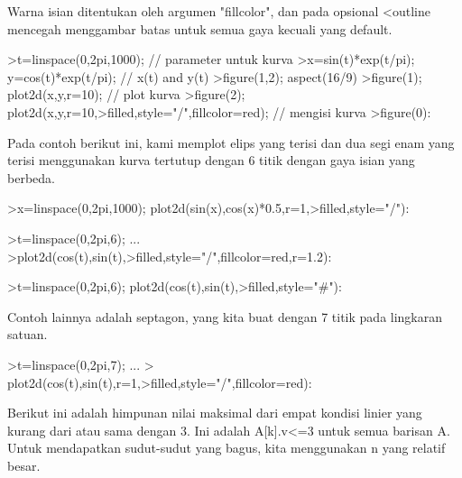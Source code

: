 \documentclass[12pt,arial,letterpaper]{book}
\begin{document}
\begin{eulernootebook}
\begin{eulercomment}
\begin{eulercomment}
\begin{eulernootebook}
\begin{eulercomment}
\begin{eulercomment}
\begin{eulercomment}
\begin{eulercomment}
\begin{eulercomment}
\begin{eulercomment}
\begin{eulercomment}
\begin{eulernotebook}
\begin{eulercomment}
\begin{eulercomment}
\begin{eulercomment}
\begin{eulercomment}
\begin{eulercomment}
Warna isian ditentukan oleh argumen "fillcolor", dan pada opsional
\textless{}outline mencegah menggambar batas untuk semua gaya kecuali yang
default.
\end{eulercomment}
\begin{eulerprompt}
>t=linspace(0,2pi,1000); // parameter untuk kurva
>x=sin(t)*exp(t/pi); y=cos(t)*exp(t/pi); // x(t) and y(t)
>figure(1,2); aspect(16/9)
>figure(1); plot2d(x,y,r=10); // plot kurva
>figure(2); plot2d(x,y,r=10,>filled,style="/",fillcolor=red); // mengisi kurva
>figure(0):
\end{eulerprompt}
\begin{eulercomment}
Pada contoh berikut ini, kami memplot elips yang terisi dan dua segi
enam yang terisi menggunakan kurva tertutup dengan 6 titik dengan gaya
isian yang berbeda.
\end{eulercomment}
\begin{eulerprompt}
>x=linspace(0,2pi,1000); plot2d(sin(x),cos(x)*0.5,r=1,>filled,style="/"):
\end{eulerprompt}
\begin{eulerprompt}
>t=linspace(0,2pi,6); ...
>plot2d(cos(t),sin(t),>filled,style="/",fillcolor=red,r=1.2):
\end{eulerprompt}
\begin{eulerprompt}
>t=linspace(0,2pi,6); plot2d(cos(t),sin(t),>filled,style="#"):
\end{eulerprompt}
\begin{eulercomment}
Contoh lainnya adalah septagon, yang kita buat dengan 7 titik pada
lingkaran satuan.
\end{eulercomment}
\begin{eulerprompt}
>t=linspace(0,2pi,7);  ...
> plot2d(cos(t),sin(t),r=1,>filled,style="/",fillcolor=red):
\end{eulerprompt}
\begin{eulercomment}
Berikut ini adalah himpunan nilai maksimal dari empat kondisi linier
yang kurang dari atau sama dengan 3. Ini adalah A[k].v\textless{}=3 untuk semua
barisan A. Untuk mendapatkan sudut-sudut yang bagus, kita menggunakan
n yang relatif besar.

\end{eulercomment}
\end{eulercomment}
\end{eulercomment}
\end{eulercomment}
\end{eulercomment}
\end{eulernotebook}
\end{eulercomment}
\end{eulercomment}
\end{eulercomment}
\end{eulercomment}
\end{eulercomment}
\end{eulercomment}
\end{eulercomment}
\end{eulernootebook}
\end{eulercomment}
\end{eulercomment}
\end{eulernootebook}
\end{document}

